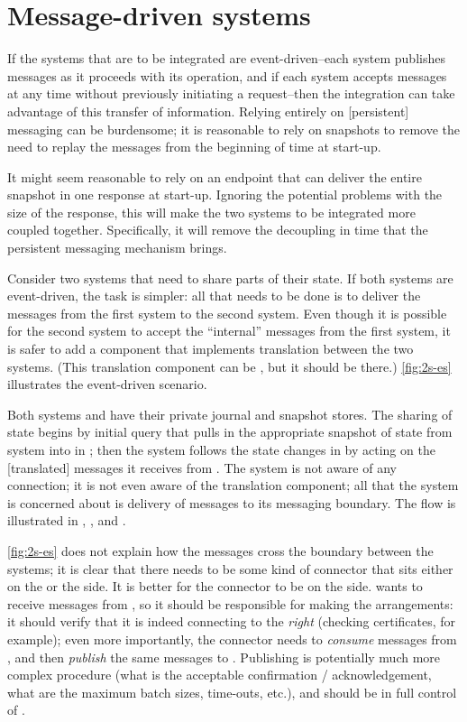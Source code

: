 \documentclass[10 pt, twocolumn]{article}
\begin{document}
\section{Message-driven systems}
If the systems that are to be integrated are event-driven--each system publishes messages as it proceeds with its operation, and if each system accepts messages at any time without previously initiating a request--then the integration can take advantage of this transfer of information. Relying entirely on [persistent] messaging can be burdensome; it is reasonable to rely on snapshots to remove the need to replay the messages from the beginning of time at start-up. 

It might seem reasonable to rely on an endpoint that can deliver the entire snapshot in one response at start-up. Ignoring the potential problems with the size of the response, this will make the two systems to be integrated more coupled together. Specifically, it will remove the decoupling in time that the persistent messaging mechanism brings. 

Consider two systems that need to share parts of their state. If both systems are event-driven, the task is simpler: all that needs to be done is to deliver the messages from the first system to the second system. Even though it is possible for the second system to accept the ``internal'' messages from the first system, it is safer to add a component that implements translation between the two systems. (This translation component can be , but it should be there.) \autoref{fig:2s-es} illustrates the event-driven scenario.


Both systems  and  have their private journal and snapshot stores. The sharing of state begins by initial query that pulls in the appropriate snapshot of state from system  into  in ; then the system  follows the state changes in  by acting on the [translated] messages it receives from . The system  is not aware of any connection; it is not even aware of the translation component; all that the system  is concerned about is delivery of messages to its messaging boundary. The flow is illustrated in , , and .

\autoref{fig:2s-es} does not explain how the messages cross the boundary between the systems; it is clear that there needs to be some kind of connector that sits either on the  or the  side. It is better for the connector to be on the  side.  wants to receive messages from , so it should be responsible for making the arrangements: it should verify that it is indeed connecting to the \emph{right}  (checking certificates, for example); even more importantly, the connector needs to \emph{consume} messages from , and then \emph{publish} the same messages to . Publishing is potentially much more complex procedure (what is the acceptable confirmation / acknowledgement, what are the maximum batch sizes, time-outs, etc.), and should be in full control of \cite{mirrormaker}.  
\end{document}
